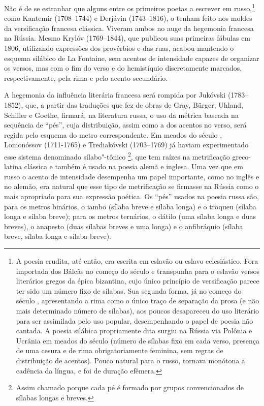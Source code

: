 Não é de se estranhar que alguns entre os primeiros poetas a escrever em
rus­so,\footnote{A poesia erudita, até então, era escrita em eslavão ou eslavo eclesiástico. Fora importada dos Bálcãs no começo do século  e transpunha para o eslavão versos literários gregos da épica bizantina, cujo único princípio de versificação parece ter sido um número fixo de sílabas. Sua segunda forma, já no começo do século , apresentando a rima como o único traço de separação da prosa (e não mais determinado número de sílabas), aos poucos desapareceu do uso literário para ser assimilada pelo uso popular, desempenhando o papel de poesia não cantada. A poesia silábica propriamente dita surgiu na Rússia via Polônia e Ucrânia em meados do século  (número de sílabas fixo em cada verso, presença de uma cesura e de rima obrigatoriamente feminina, sem regras de distribuição de acentos). Pouco natural para o russo, tornava monótona a cadência da língua, e foi de duração efêmera.} como Kantemir (1708--1744) e Derjávin (1743--1816), o tenham feito nos moldes da
versificação fran­cesa clássica. Viveram ambos no auge da hegemonia
francesa na Rússia. Mesmo
Krylóv (1769--1844), que publicou suas primeiras fábulas em 1806, utilizando expressões
dos provérbios e das ruas, acabou man­tendo o esquema silábico de La
Fontaine, sem acentos de intensidade capazes de organizar os versos, mas
com o fim do verso e do hemistíquio discreta­mente marcados,
respectivamente, pela rima e pelo acento secundário.

A hegemonia da influência literária francesa será rompida por Jukóvski (1783--1852),
que, a partir das traduções que fez de obras de Gray, Bürger, Uhland,
Schiller e Goethe, firmará, na literatura russa, o uso da métrica baseada
na sequência de ``pés'', cuja distribuição, assim como a dos
acentos no verso, será regida pelo esquema do metro correspondente. Em
meados do século , Lomonóssov (1711-1765) e Trediakóvski (1703--1769) já haviam
experimentado esse sistema denomina­do sílabo"-tônico \footnote{Assim chamado porque cada pé é formado por grupos convencionados de sílabas longas e breves.}, que tem raízes na
metrificação greco-latina clássica e tam­bém é usado na poesia alemã e
inglesa. Uma vez que em russo o acento de intensidade desempenha um
papel importante, como no inglês e no alemão, era natural que esse tipo
de metrificação se firmasse na Rússia como o mais apropriado para
sua expressão poética. Os ``pés'' usados na poesia russa são, para os
metros binários, o iambo (sílaba breve e sílaba longa) e o troqueu
(sílaba longa e sílaba breve); para os metros ternários, o dátilo (uma
sílaba lon­ga e duas breves), o anapesto (duas sílabas breves e uma
longa) e o anfibráquio (sílaba breve, sílaba longa e sílaba breve).

